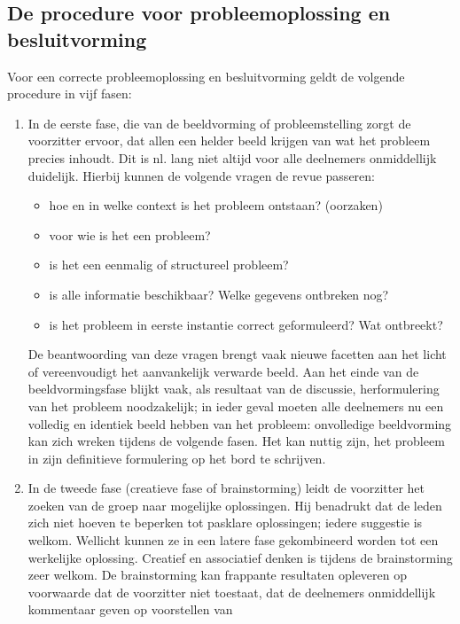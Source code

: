 \subsection{De procedure voor probleemoplossing en besluitvorming}
\label{besluitvorming}
Voor een correcte probleemoplossing en besluitvorming geldt de
volgende procedure in vijf fasen:
\begin{enumerate}
\item    In de eerste fase, die van de beeldvorming of probleemstelling zorgt de voorzitter ervoor, dat allen een helder
     beeld krijgen van wat het probleem precies inhoudt. Dit
     is nl. lang niet altijd voor alle deelnemers onmiddellijk
     duidelijk.
     Hierbij kunnen de volgende vragen de revue passeren:
\begin{itemize}
     \item    hoe en in welke context is het probleem ontstaan?
          (oorzaken)
     \item    voor wie is het een probleem?
     \item    is het een eenmalig of structureel probleem?
     \item    is alle informatie beschikbaar? Welke gegevens ontbreken nog?
     \item    is het probleem in eerste instantie correct geformuleerd? Wat ontbreekt?
\end{itemize}     
     De beantwoording van deze vragen brengt vaak nieuwe facetten aan het licht of vereenvoudigt het aanvankelijk
     verwarde beeld.
     Aan het einde van de beeldvormingsfase blijkt vaak, als
     resultaat van de discussie, herformulering van het probleem noodzakelijk; in ieder geval moeten alle deelnemers
     nu een volledig en identiek beeld hebben van het probleem: onvolledige beeldvorming kan zich wreken tijdens
     de volgende fasen.
     Het kan nuttig zijn, het probleem in zijn definitieve
     formulering op het bord te schrijven.
\item    In de tweede fase (creatieve fase of brainstorming) leidt
     de voorzitter het zoeken van de groep naar mogelijke
     oplossingen.
     Hij benadrukt dat de leden zich niet hoeven te beperken
     tot pasklare oplossingen; iedere suggestie is welkom.
     Wellicht kunnen ze in een latere fase gekombineerd worden
     tot een werkelijke oplossing. Creatief en associatief
     denken is tijdens de brainstorming zeer welkom.
     De brainstorming kan frappante resultaten opleveren op
     voorwaarde dat de voorzitter niet toestaat, dat de deelnemers onmiddellijk kommentaar geven op voorstellen van

\end{enumerate}
